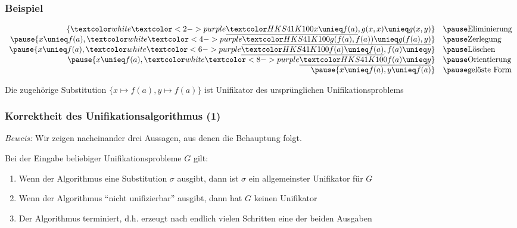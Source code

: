 \documentclass[aspectratio=1610,onlymath]{beamer}
\begin{document}
\begin{frame}\frametitle{Beispiel}

\[
\begin{array}{rl}
\{\hi{2-}{x\unieq f(a)}, g(x,x)\unieq g(x,y)\} & \pause\text{Eliminierung}\\\pause
\{x\unieq f(a), \hi{4-}{g(f(a),f(a))\unieq g(f(a),y)}\} & \pause\text{Zerlegung}\\\pause
\{x\unieq f(a), \hi{6-}{f(a)\unieq f(a)}, f(a)\unieq y\} & \pause\text{Löschen}\\\pause
\{x\unieq f(a), \hi{8-}{f(a)\unieq y}\} & \pause\text{Orientierung}\\\pause
\{x\unieq f(a), y\unieq f(a)\} & \pause\text{gelöste Form}
\end{array}
\]
\bigskip

Die zugehörige Substitution $\{x\mapsto f(a), y\mapsto f(a)\}$ ist Unifikator des
ursprünglichen Unifikationsproblems

\end{frame}

\begin{frame}[t]\frametitle{Korrektheit des Unifikationsalgorithmus (1)}


\emph{Beweis:} Wir zeigen nacheinander drei Aussagen, aus denen die Behauptung folgt.\medskip

Bei der Eingabe beliebiger Unifikationsprobleme $G$ gilt:
\begin{enumerate}[(1)]
\item Wenn der Algorithmus eine Substitution $\sigma$ ausgibt, dann ist $\sigma$ ein allgemeinster Unifikator für $G$
\item Wenn der Algorithmus "`nicht unifizierbar"' ausgibt, dann hat $G$ keinen Unifikator
\item Der Algorithmus terminiert, d.h. erzeugt nach endlich vielen Schritten eine der beiden Ausgaben
\end{enumerate}

\end{frame}
\end{document}
